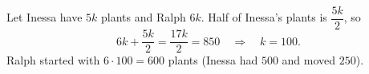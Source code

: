 Let Inessa have $5k$ plants and Ralph $6k$. Half of Inessa's plants is $\dfrac{5k}{2}$, so
\[
6k+\dfrac{5k}{2}=\dfrac{17k}{2}=850\quad\Longrightarrow\quad k=100 .
\]
Ralph started with $6\cdot100=\boxed{600}$ plants (Inessa had $500$ and moved $250$).
